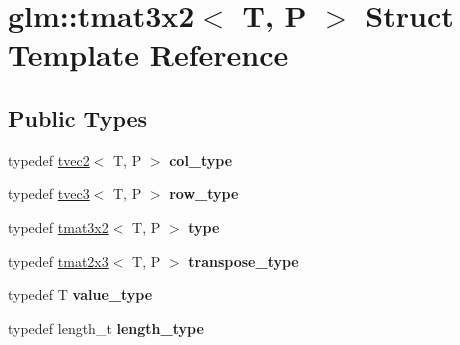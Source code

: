 \hypertarget{structglm_1_1tmat3x2}{\section{glm\-:\-:tmat3x2$<$ T, P $>$ Struct Template Reference}
\label{structglm_1_1tmat3x2}
}
\subsection*{Public Types}
\begin{DoxyCompactItemize}
\item 
\hypertarget{structglm_1_1tmat3x2_a341f5be67463bce97692bc232312b7e8}{typedef \hyperlink{structglm_1_1tvec2}{tvec2}$<$ T, P $>$ {\bfseries col\-\_\-type}}\label{structglm_1_1tmat3x2_a341f5be67463bce97692bc232312b7e8}

\item 
\hypertarget{structglm_1_1tmat3x2_a54b0650d908b47bb1410661d9b049d90}{typedef \hyperlink{structglm_1_1tvec3}{tvec3}$<$ T, P $>$ {\bfseries row\-\_\-type}}\label{structglm_1_1tmat3x2_a54b0650d908b47bb1410661d9b049d90}

\item 
\hypertarget{structglm_1_1tmat3x2_a170987a0b4f9663c8beeaca40042e0c8}{typedef \hyperlink{structglm_1_1tmat3x2}{tmat3x2}$<$ T, P $>$ {\bfseries type}}\label{structglm_1_1tmat3x2_a170987a0b4f9663c8beeaca40042e0c8}

\item 
\hypertarget{structglm_1_1tmat3x2_a2ab17a834a083c22dae03db5057bc235}{typedef \hyperlink{structglm_1_1tmat2x3}{tmat2x3}$<$ T, P $>$ {\bfseries transpose\-\_\-type}}\label{structglm_1_1tmat3x2_a2ab17a834a083c22dae03db5057bc235}

\item 
\hypertarget{structglm_1_1tmat3x2_a68ba5fe1734aa7ee61cc637b5de9f696}{typedef T {\bfseries value\-\_\-type}}\label{structglm_1_1tmat3x2_a68ba5fe1734aa7ee61cc637b5de9f696}

\item 
\hypertarget{structglm_1_1tmat3x2_a358b949a615ed48c4dc18c53a55358df}{typedef length\-\_\-t {\bfseries length\-\_\-type}}\label{structglm_1_1tmat3x2_a358b949a615ed48c4dc18c53a55358df}

\end{DoxyCompactItemize}
